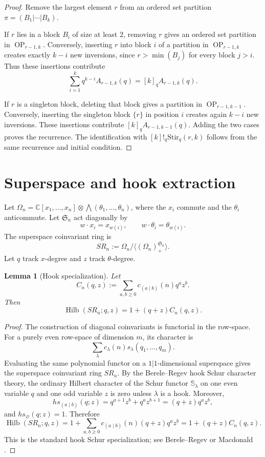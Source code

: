 \documentclass[11pt]{article}
\newtheorem{lemma}[theorem]{Lemma}
\DeclareMathOperator{\Hilb}{Hilb}
\DeclareMathOperator{\OP}{OP}
\newcommand{\C}{\mathbb{C}}
\newcommand{\Sn}{\mathfrak{S}_n}
\begin{document}
\begin{proof}
Remove the largest element \(r\) from an ordered set partition
\(\pi=(B_1|\cdots|B_k)\).

If \(r\) lies in a block \(B_i\) of size at least \(2\), removing \(r\) gives an
ordered set partition in \(\OP_{r-1,k}\). Conversely, inserting \(r\) into block
\(i\) of a partition in \(\OP_{r-1,k}\) creates exactly \(k-i\) new inversions,
since \(r>\min(B_j)\) for every block \(j>i\). Thus these insertions contribute
\[
\sum_{i=1}^k q^{k-i} A_{r-1,k}(q)=[k]_q A_{r-1,k}(q).
\]

If \(r\) is a singleton block, deleting that block gives a partition in
\(\OP_{r-1,k-1}\). Conversely, inserting the singleton block \(\{r\}\) in
position \(i\) creates again \(k-i\) new inversions. These insertions contribute
\([k]_q A_{r-1,k-1}(q)\). Adding the two cases proves the recurrence. The
identification with \([k]!_q\mathrm{Stir}_q(r,k)\) follows from the same recurrence
and initial condition.
\end{proof}

\section{Superspace and hook extraction}

Let \(\Omega_n=\C[x_1,\dots,x_n]\otimes \bigwedge(\theta_1,\dots,\theta_n)\), where
the \(x_i\) commute and the \(\theta_i\) anticommute. Let \(\Sn\) act diagonally by
\[
w\cdot x_i=x_{w(i)},\qquad w\cdot \theta_i=\theta_{w(i)}.
\]
The superspace coinvariant ring is
\[
SR_n:=\Omega_n/\langle(\Omega_n)^{\Sn}_+\rangle.
\]
Let \(q\) track \(x\)-degree and \(z\) track \(\theta\)-degree.

\begin{lemma}[Hook specialization]
Let
\[
C_n(q,z):=\sum_{a,b\geq 0} c_{(a\mid b)}(n)q^a z^b.
\]
Then
\[
\Hilb(SR_n;q,z)=1+(q+z)C_n(q,z).
\]
\end{lemma}

\begin{proof}
The construction of diagonal coinvariants is functorial in the row-space. For a
purely even row-space of dimension \(m\), its character is
\[
\sum_\lambda c_\lambda(n)s_\lambda(q_1,\dots,q_m).
\]
Evaluating the same polynomial functor on a \(1|1\)-dimensional superspace gives
the superspace coinvariant ring \(SR_n\). By the Berele--Regev hook Schur
character theory, the ordinary Hilbert character of the Schur functor
\(\mathbb S_\lambda\) on one even variable \(q\) and one odd variable \(z\) is zero
unless \(\lambda\) is a hook. Moreover,
\[
hs_{(a\mid b)}(q;z)=q^{a+1}z^b+q^a z^{b+1}=(q+z)q^a z^b,
\]
and \(hs_\varnothing(q;z)=1\). Therefore
\[
\Hilb(SR_n;q,z)
=
1+\sum_{a,b\geq 0}c_{(a\mid b)}(n)(q+z)q^a z^b
=
1+(q+z)C_n(q,z).
\]
This is the standard hook Schur specialization; see Berele--Regev
\cite{BereleRegev} or Macdonald \cite[Ch.~I, \S3, Ex.~23]{Macdonald}.
\end{proof}
\end{document}
